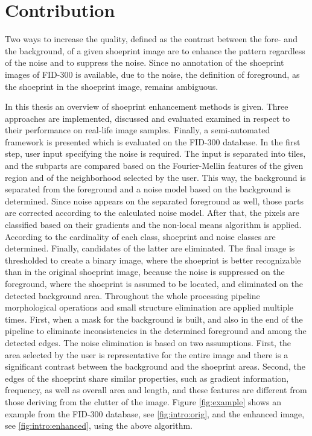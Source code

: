 \documentclass[draft,final]{vutinfth} %
\begin{document}
\section{Contribution}
\par
Two ways to increase the quality, defined as the contrast between the fore- and the background, of a given shoeprint image are to enhance the pattern regardless of the noise and to suppress the noise.
Since no annotation of the shoeprint images of FID-300 is available, due to the noise, the definition of foreground, as the shoeprint in the shoeprint image, remains ambiguous.

\par
In this thesis an overview of shoeprint enhancement methods is given.
Three approaches are implemented, discussed and evaluated examined in respect to their performance on real-life image samples.
Finally, a semi-automated framework is presented which is evaluated on the FID-300 database.
In the first step, user input specifying the noise is required.
The input is separated into tiles, and the subparts are compared based on the Fourier-Mellin features of the given region and of the neighborhood selected by the user.
This way, the background is separated from the foreground and a noise model based on the background is determined.
Since noise appears on the separated foreground as well, those parts are corrected according to the calculated noise model.
After that, the pixels are classified based on their gradients and the non-local means algorithm is applied.
According to the cardinality of each class, shoeprint and noise classes are determined.
Finally, candidates of the latter are eliminated.
The final image is thresholded to create a binary image, where the shoeprint is better recognizable than in the original shoeprint image, because the noise is suppressed on the foreground, where the shoeprint is assumed to be located, and eliminated on the detected background area.
Throughout the whole processing pipeline morphological operations and small structure elimination are applied multiple times. 
First, when a mask for the background is built, and also in the end of the pipeline to eliminate inconsistencies in the determined foreground and among the detected edges.
The noise elimination is based on two assumptions.
First, the area selected by the user is representative for the entire image and there is a significant contrast between the background and the shoeprint areas.
Second, the edges of the shoeprint share similar properties, such as gradient information, frequency, as well as overall area and length, and these features are different from those deriving from the clutter of the image.
Figure \ref{fig:example} shows an example from the FID-300 database, see \ref{fig:intro:orig}, and the enhanced image, see \ref{fig:intro:enhanced}, using the above algorithm.
\end{document}
